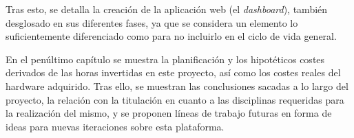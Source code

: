 Tras esto, se detalla la creación de la aplicación web (el \textit{dashboard}), también desglosado en sus diferentes fases, ya que se considera un elemento lo suficientemente diferenciado como para no incluirlo en el ciclo de vida general.

En el penúltimo capítulo se muestra la planificación y los hipotéticos costes derivados de las horas invertidas en este proyecto, así como los costes reales del hardware adquirido. Tras ello, se muestran las conclusiones sacadas a lo largo del proyecto, la relación con la titulación en cuanto a las disciplinas requeridas para la realización del mismo, y se proponen líneas de trabajo futuras en forma de ideas para nuevas iteraciones sobre esta plataforma. 
